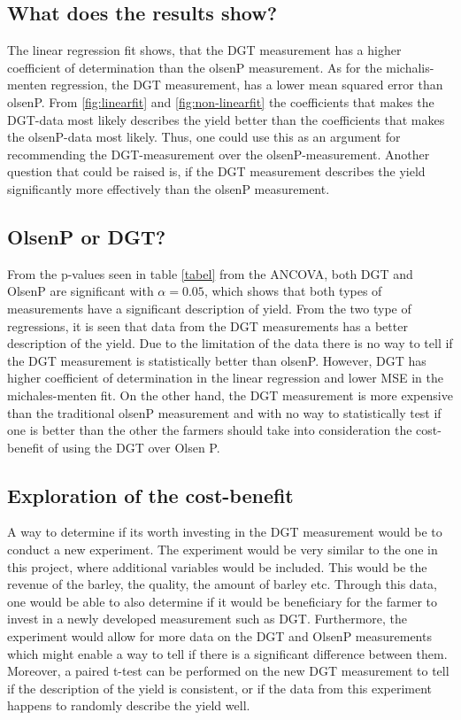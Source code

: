 \documentclass[11pt, fleqn, titlepage]{article}
\begin{document}
\subsection*{What does the results show?}
The linear regression fit shows, that the DGT measurement has a higher coefficient of determination than the olsenP measurement. As for the michalis-menten regression, the DGT measurement, has a lower mean squared error than olsenP. From \ref{fig:linearfit} and \ref{fig:non-linearfit} the coefficients that makes the DGT-data most likely describes the yield better than the coefficients that makes the olsenP-data most likely. Thus, one could use this as an argument for recommending the DGT-measurement over the olsenP-measurement. Another question that could be raised is, if the DGT measurement describes the yield significantly more effectively than the olsenP measurement.

\subsection*{OlsenP or DGT?} 
From the p-values seen in table \ref{tabel} from the ANCOVA, both DGT and OlsenP are significant with $ \alpha = 0.05 $, which shows that both types of measurements have a significant description of yield. From the two type of regressions, it is seen that data from the DGT measurements has a better description of the yield. Due to the limitation of the data there is no way to tell if the DGT measurement is statistically better than olsenP. However, DGT has higher coefficient of determination in the linear regression and lower MSE in the michales-menten fit. On the other hand, the DGT measurement is more expensive than the traditional olsenP measurement and with no way to statistically test if one is better than the other the farmers should take into consideration the cost-benefit of using the DGT over Olsen P. 

\subsection*{Exploration of the cost-benefit }
A way to determine if its worth investing in the DGT measurement would be to conduct a new experiment. The experiment would be very similar to the one in this project, where additional variables would be included. This would be the revenue of the barley, the quality, the amount of barley etc. Through this data, one would be able to also determine if it would be beneficiary for the farmer to invest in a newly developed measurement such as DGT. Furthermore, the experiment would allow for more data on the DGT and OlsenP measurements which might enable a way to tell if there is a significant difference between them. Moreover, a paired t-test can be performed on the new DGT measurement to tell if the description of the yield is consistent, or if the data from this experiment happens to randomly describe the yield well. 
\end{document}
